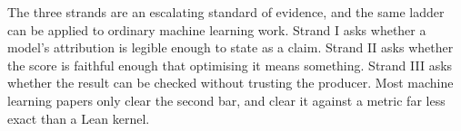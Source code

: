 \begin{aside}
The three strands are an escalating standard of evidence, and the same ladder can be applied to
ordinary machine learning work. Strand I asks whether a model's attribution
is legible enough to state as a claim. Strand II asks whether the score is faithful enough that
optimising it means something. Strand III asks whether the result can be checked without trusting
the producer. Most machine learning papers only clear the second bar, and clear it against a
metric far less exact than a Lean kernel.
\end{aside}
